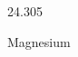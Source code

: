 \documentclass[12pt]{article}
\begin{document}
\hfill{}
\vfill
\begin{center}
  {\fontsize{50}{60}
  }

  \vspace{1em}

  24.305

Magnesium
\end{center}
\vfill
\end{document}
